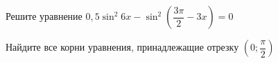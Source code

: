 \begin{ex}
	\begin{condition}
		\begin{enumcols}[label=\asbuk*)]
			\item Решите уравнение \( 0,5\sin^2 6x-\sin^2{\left(\dfrac{3\pi}{2}-3x\right)}= 0 \)
			\item Найдите все корни уравнения, принадлежащие отрезку \( \left(0;\dfrac{\pi}{2}\right) \)
		\end{enumcols}
	\end{condition}
\end{ex}